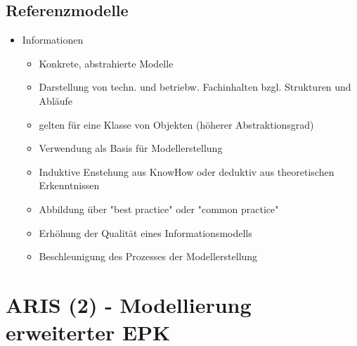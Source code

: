 \documentclass[11pt,a4paper]{article}
\begin{document}
\subsection{Referenzmodelle}
\begin{itemize}

	\item Informationen
		\begin{itemize}
		\item Konkrete, abstrahierte Modelle
		\item Darstellung von techn. und betriebw. Fachinhalten bzgl. Strukturen und Abläufe
		\item gelten für eine Klasse von Objekten (höherer Abstraktionsgrad)
		\item Verwendung als Basis für Modellerstellung
		\item Induktive Enstehung aus KnowHow oder deduktiv aus theoretischen Erkenntnissen
		\item Abbildung über "best practice" oder "common practice"
		\item Erhöhung der Qualität eines Informationsmodells
		\item Beschleunigung des Prozesses der Modellerstellung
		\end{itemize}
	

\end{itemize}

\section{ARIS (2) - Modellierung erweiterter EPK}
\end{document}
